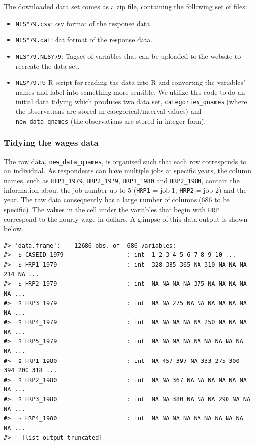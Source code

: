 \documentclass[12pt]{article}
\providecommand{\tightlist}{%
  \setlength{\itemsep}{0pt}\setlength{\parskip}{0pt}}
\begin{document}
The downloaded data set comes as a zip file, containing the following set of files:

\begin{itemize}
\tightlist
\item
  \texttt{NLSY79.csv}: csv format of the response data.
\item
  \texttt{NLSY79.dat}: dat format of the response data.
\item
  \texttt{NLSY79.NLSY79}: Tagset of variables that can be uploaded to the website to recreate the data set.
\item
  \texttt{NLSY79.R}: R script for reading the data into R and converting the variables' names and label into something more sensible. We utilize this code to do an initial data tidying which produces two data set, \texttt{categories\_qnames} (where the observations are stored in categorical/interval values) and \texttt{new\_data\_qnames} (the observations are stored in integer form).
\end{itemize}

\hypertarget{tidywages}{%
\subsubsection{Tidying the wages data}\label{tidywages}}

The raw data, \texttt{new\_data\_qnames}, is organised such that each row corresponds to an individual. As respondents can have multiple jobs at specific years, the column names, such as \texttt{HRP1\_1979}, \texttt{HRP2\_1979}, \texttt{HRP1\_1980} and \texttt{HRP2\_1980}, contain the information about the job number up to 5 (\texttt{HRP1} = job 1, \texttt{HRP2} = job 2) and the year. The raw data consequently has a large number of columns (686 to be specific). The values in the cell under the variables that begin with \texttt{HRP} correspond to the hourly wage in dollars. A glimpse of this data output is shown below.

\begin{verbatim}
#> 'data.frame':    12686 obs. of  686 variables:
#>  $ CASEID_1979                  : int  1 2 3 4 5 6 7 8 9 10 ...
#>  $ HRP1_1979                    : int  328 385 365 NA 310 NA NA NA 214 NA ...
#>  $ HRP2_1979                    : int  NA NA NA NA 375 NA NA NA NA NA ...
#>  $ HRP3_1979                    : int  NA NA 275 NA NA NA NA NA NA NA ...
#>  $ HRP4_1979                    : int  NA NA NA NA NA 250 NA NA NA NA ...
#>  $ HRP5_1979                    : int  NA NA NA NA NA NA NA NA NA NA ...
#>  $ HRP1_1980                    : int  NA 457 397 NA 333 275 300 394 200 318 ...
#>  $ HRP2_1980                    : int  NA NA 367 NA NA NA NA NA NA NA ...
#>  $ HRP3_1980                    : int  NA NA 380 NA NA NA 290 NA NA NA ...
#>  $ HRP4_1980                    : int  NA NA NA NA NA NA NA NA NA NA ...
#>   [list output truncated]
\end{verbatim}
\end{document}

